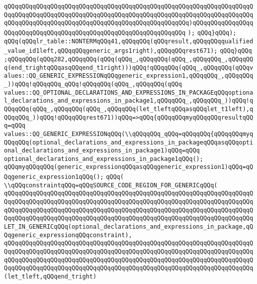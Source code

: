 \verb|qQQqqQQqqQQqqQQqqQQqqQQqqQQqqQQqqQQqqQQqqQQqqQQqqQQqqQQqqQQqqQQqqQQqqQQqqQQqqQQqqQQqqQQqqQQqqQQqqQQqqQQqqQQqqQQqqQQqqQQqqQQqqQQqqQQqqQQqqQQqqQQqqQQqqQQqqQQqqQQqqQQqqQQqqQQqqQQqqQQqqQQqqQQqqQQq)qQQqqQQqqQQqqQQqqQQqqQQqqQQqqQQqqQQqqQQqqQQqqQQqqQQqqQQqqQQqqQQqqQQq|\newline
\verb|);|\newline
\verb|qQQq}qQQq);|\newline
\verb|qQQq(qQQqlr_table::NONTERMqQQq41,qQQqqQQq(qQQqresult,qQQqqQQqqualified_value_id1left,qQQqqQQqgeneric_args1right),qQQqqQQqrest671);|\newline
\verb|qQQq}qQQq|\newline
\verb|;qQQqqQQq(qQQq282,qQQqqQQq(qQQq(qQQq_,qQQqqQQq(qQQq_,qQQqqQQq_,qQQqqQQq(end_trightqQQqasqQQqend_t1right)))qQQq!qQQqqQQq(qQQq_,qQQqqQQq(qQQqvalues::QQ_GENERIC_EXPRESSIONqQQqgeneric_expression1,qQQqqQQq_,qQQqqQQq_))qQQq!qQQqqQQq_qQQq!qQQqqQQq(qQQq_,qQQqqQQq(qQQq|\newline
\verb|values::QQ_OPTIONAL_DECLARATIONS_AND_EXPRESSIONS_IN_PACKAGEqQQqoptional_declarations_and_expressions_in_package1,qQQqqQQq_,qQQqqQQq_))qQQq!qQQqqQQq(qQQq_,qQQqqQQq(qQQq_,qQQqqQQq(let_tleftqQQqasqQQqlet_t1left),qQQqqQQq_))qQQq!qQQqqQQqrest671))qQQq=>qQQq{qQQqqQQqmyqQQqqQQqresultqQQq=qQQq|\newline
\verb|values::QQ_GENERIC_EXPRESSIONqQQq(\\qQQqqQQq_qQQq=qQQqqQQq{qQQqqQQqmyqQQqqQQq(optional_declarations_and_expressions_in_packageqQQqasqQQqoptional_declarations_and_expressions_in_package1)qQQq=qQQq|\newline
\verb|optional_declarations_and_expressions_in_package1qQQq();|\newline
\verb|qQQqmyqQQqqQQq(generic_expressionqQQqasqQQqgeneric_expression1)qQQq=qQQqgeneric_expression1qQQq();|\newline
\verb|qQQq(|\newline
\verb|\\qQQqconstraintqQQq=qQQqSOURCE_CODE_REGION_FOR_GENERICqQQq(|\newline
\verb|qQQqqQQqqQQqqQQqqQQqqQQqqQQqqQQqqQQqqQQqqQQqqQQqqQQqqQQqqQQqqQQqqQQqqQQqqQQqqQQqqQQqqQQqqQQqqQQqqQQqqQQqqQQqqQQqqQQqqQQqqQQqqQQqqQQqqQQqqQQqqQQqqQQqqQQqqQQqqQQqqQQqqQQqqQQqqQQqqQQqqQQqqQQqqQQqqQQqqQQqqQQqqQQqqQQqqQQqqQQqqQQqqQQqqQQqqQQqqQQqqQQqqQQqqQQqqQQqqQQqqQQqqQQqqQQqqQQqqQQqLET_IN_GENERICqQQq(optional_declarations_and_expressions_in_package,qQQqgeneric_expressionqQQqconstraint),|\newline
\verb|qQQqqQQqqQQqqQQqqQQqqQQqqQQqqQQqqQQqqQQqqQQqqQQqqQQqqQQqqQQqqQQqqQQqqQQqqQQqqQQqqQQqqQQqqQQqqQQqqQQqqQQqqQQqqQQqqQQqqQQqqQQqqQQqqQQqqQQqqQQqqQQqqQQqqQQqqQQqqQQqqQQqqQQqqQQqqQQqqQQqqQQqqQQqqQQqqQQqqQQqqQQqqQQqqQQqqQQqqQQqqQQqqQQqqQQqqQQqqQQqqQQqqQQqqQQqqQQqqQQqqQQqqQQqqQQqqQQqqQQq(let_tleft,qQQqend_tright)|\newline
